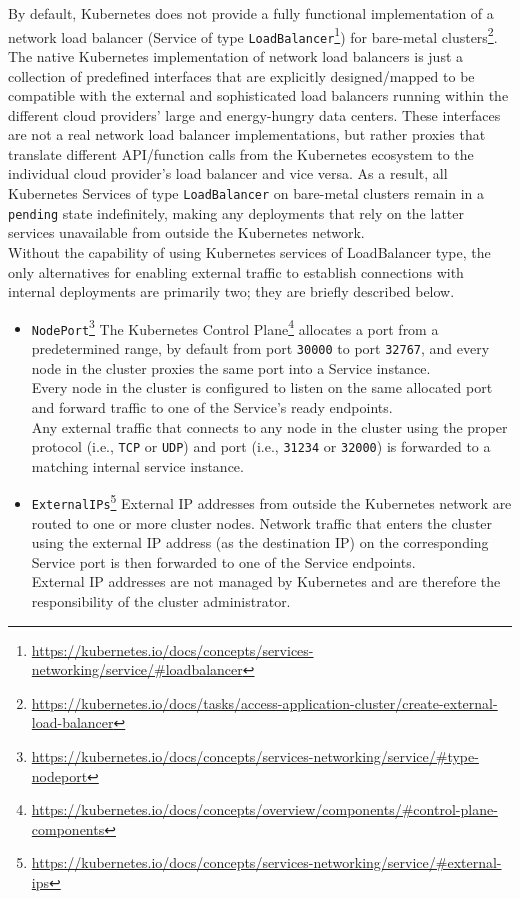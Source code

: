 By default, Kubernetes does not provide a fully functional implementation of a
network load balancer (Service of type \texttt{LoadBalancer}\footnote{\url{https://kubernetes.io/docs/concepts/services-networking/service/\#loadbalancer}})
for bare-metal clusters\footnote{\url{https://kubernetes.io/docs/tasks/access-application-cluster/create-external-load-balancer}}.
The native Kubernetes implementation of network load balancers is just a
collection of predefined interfaces that are explicitly designed/mapped to be
compatible with the external and sophisticated load balancers running within the
different cloud providers' large and energy-hungry data centers. These
interfaces are not a real network load balancer implementations, but rather proxies
that translate different API/function calls from the Kubernetes ecosystem to the
individual cloud provider's load balancer and vice versa. As a result, all Kubernetes
Services of type \texttt{LoadBalancer} on bare-metal clusters remain in a
\texttt{pending} state indefinitely, making any deployments that rely on the
latter services unavailable from outside the Kubernetes network. \\ %
Without the capability of using Kubernetes services of LoadBalancer type, the only
alternatives for enabling external traffic to establish connections with internal
deployments are primarily two; they are briefly described below.
\begin{itemize}
  \item \texttt{NodePort}\footnote{\url{https://kubernetes.io/docs/concepts/services-networking/service/\#type-nodeport}}
    \newline
    The Kubernetes Control Plane\footnote{\url{https://kubernetes.io/docs/concepts/overview/components/\#control-plane-components}}
    allocates a port from a predetermined range, by default from port \texttt{30000}
    to port \texttt{32767}, and every node in the cluster proxies the same port
    into a Service instance. \\ %
    Every node in the cluster is configured to listen on the same allocated port
    and forward traffic to one of the Service's ready endpoints. \\ %
    Any external traffic that connects to any node in the cluster using the
    proper protocol (i.e., \texttt{TCP} or \texttt{UDP}) and port (i.e., \texttt{31234}
    or \texttt{32000}) is forwarded to a matching internal service instance.

  \item \texttt{ExternalIPs}\footnote{\url{https://kubernetes.io/docs/concepts/services-networking/service/\#external-ips}}
    \newline
    External IP addresses from outside the Kubernetes network are routed to one
    or more cluster nodes. Network traffic that enters the cluster using the external
    IP address (as the destination IP) on the corresponding Service port is then
    forwarded to one of the Service endpoints. \\ %
    External IP addresses are not managed by Kubernetes and are therefore the responsibility
    of the cluster administrator.
\end{itemize}

